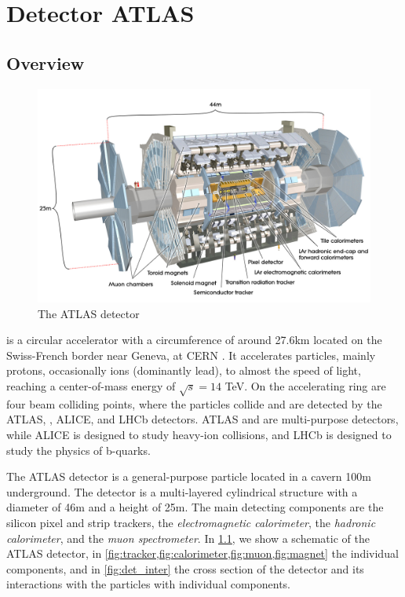 \chapter{Detector ATLAS}

\section{Overview}
\begin{figure}[htb]
    \centering
    \includegraphics[width=1\linewidth]{src/img/atlas.jpg}
    \caption{The ATLAS detector}
    \label{fig:atlas}
\end{figure}

\LHC is a circular accelerator with a circumference of around 27.6km located on the Swiss-French border near Geneva, at CERN \cite{cern}.
It accelerates particles, mainly protons, occasionally ions (dominantly lead), to almost the speed of light, reaching a center-of-mass energy of $\sqrt{s} = 14$ TeV.
On the accelerating ring are four beam colliding points, where the particles collide and are detected by the ATLAS, \CMS, ALICE, and LHCb detectors.
ATLAS and \CMS are multi-purpose detectors, while ALICE is designed to study heavy-ion collisions, and LHCb is designed to study the physics of b-quarks.


The ATLAS detector \cite{ATLAS} is a general-purpose particle located in a cavern 100m underground.
The detector is a multi-layered cylindrical structure with a diameter of 46m and a height of 25m.
The main detecting components are the silicon pixel and strip trackers, the \emph{electromagnetic \LAr calorimeter}, the\emph{ hadronic calorimeter}, and the\emph{ muon spectrometer}.
In \cref{fig:atlas}, we show a schematic of the ATLAS detector, in \cref{fig:tracker,fig:calorimeter,fig:muon,fig:magnet} the individual components, and in \cref{fig:det_inter} the cross section of the detector and its interactions with the particles with individual components.

